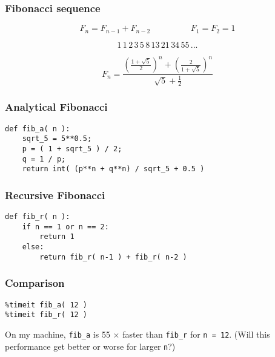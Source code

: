 \documentclass[11pt]{beamer}
\begin{document}
\begin{frame}[fragile]
  \frametitle{Fibonacci sequence}
  \Enlarge

  $$
  F_{n} = F_{n-1} + F_{n-2} \hspace{2cm} F_{1} = F_{2} = 1
  $$

  $$
  1\,1\,2\,3\,5\,8\,13\,21\,34\,55\,...
  $$

  \pause

  $$
  F_{n} = \frac{\left( \frac{1+\sqrt{5}}{2} \right)^{n} + \left( \frac{2}{1+\sqrt{5}} \right)^{n}}{\sqrt{5} + \frac{1}{2}}
  $$
\end{frame}

\begin{frame}[fragile]
  \frametitle{Analytical Fibonacci}
  \Enlarge

  \begin{Verbatim}
def fib_a( n ):
    sqrt_5 = 5**0.5;
    p = ( 1 + sqrt_5 ) / 2;
    q = 1 / p;
    return int( (p**n + q**n) / sqrt_5 + 0.5 )
  \end{Verbatim}
\end{frame}

\begin{frame}[fragile]
  \frametitle{Recursive Fibonacci}
  \Enlarge

  \begin{Verbatim}
def fib_r( n ):
    if n == 1 or n == 2:
        return 1
    else:
        return fib_r( n-1 ) + fib_r( n-2 )
  \end{Verbatim}
\end{frame}

\begin{frame}[fragile]
  \frametitle{Comparison}
  \Enlarge

  \begin{Verbatim}
%timeit fib_a( 12 )
%timeit fib_r( 12 )
  \end{Verbatim}
  \pause
  \begin{enumerate}
  \myitem  On my machine, \texttt{fib\_a} is 55 $\times$ faster than \texttt{fib\_r} for \texttt{n = 12}.  (Will this performance get better or worse for larger \texttt{n}?)
  \end{enumerate}
\end{frame}
\end{document}
